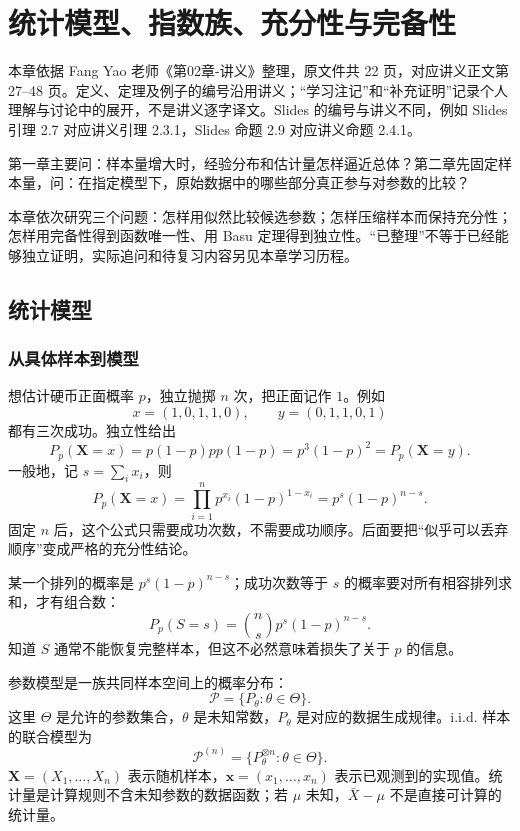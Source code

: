 \chapter{统计模型、指数族、充分性与完备性}

本章依据 Fang Yao 老师《第02章-讲义》整理，原文件共 22 页，对应讲义正文第 27--48 页。定义、定理及例子的编号沿用讲义；“学习注记”和“补充证明”记录个人理解与讨论中的展开，不是讲义逐字译文。Slides 的编号与讲义不同，例如 Slides 引理 2.7 对应讲义引理 2.3.1，Slides 命题 2.9 对应讲义命题 2.4.1。

\begin{notebox}
第一章主要问：样本量增大时，经验分布和估计量怎样逼近总体？第二章先固定样本量，问：在指定模型下，原始数据中的哪些部分真正参与对参数的比较？

本章依次研究三个问题：怎样用似然比较候选参数；怎样压缩样本而保持充分性；怎样用完备性得到函数唯一性、用 Basu 定理得到独立性。“已整理”不等于已经能够独立证明，实际追问和待复习内容另见本章学习历程。
\end{notebox}

\section{统计模型}

\subsection{从具体样本到模型}
想估计硬币正面概率 $p$，独立抛掷 $n$ 次，把正面记作 $1$。例如
\[
 x=(1,0,1,1,0),\qquad y=(0,1,1,0,1)
\]
都有三次成功。独立性给出
\[
 P_p(\mathbf X=x)=p(1-p)pp(1-p)=p^3(1-p)^2=P_p(\mathbf X=y).
\]
一般地，记 $s=\sum_i x_i$，则
\[
 P_p(\mathbf X=x)
 =\prod_{i=1}^n p^{x_i}(1-p)^{1-x_i}
 =p^s(1-p)^{n-s}.
\]
固定 $n$ 后，这个公式只需要成功次数，不需要成功顺序。后面要把“似乎可以丢弃顺序”变成严格的充分性结论。

\begin{notebox}[具体排列与成功次数不是同一个事件]
某一个排列的概率是 $p^s(1-p)^{n-s}$；成功次数等于 $s$ 的概率要对所有相容排列求和，才有组合数：
\[
 P_p(S=s)=\binom ns p^s(1-p)^{n-s}.
\]
知道 $S$ 通常不能恢复完整样本，但这不必然意味着损失了关于 $p$ 的信息。
\end{notebox}

参数模型是一族共同样本空间上的概率分布：
\[
 \mathcal P=\{P_\theta:\theta\in\Theta\}.
\]
这里 $\Theta$ 是允许的参数集合，$\theta$ 是未知常数，$P_\theta$ 是对应的数据生成规律。i.i.d. 样本的联合模型为
\[
 \mathcal P^{(n)}=\{P_\theta^{\otimes n}:\theta\in\Theta\}.
\]
$\mathbf X=(X_1,\ldots,X_n)$ 表示随机样本，$\mathbf x=(x_1,\ldots,x_n)$ 表示已观测到的实现值。统计量是计算规则不含未知参数的数据函数；若 $\mu$ 未知，$\bar X-\mu$ 不是直接可计算的统计量。

